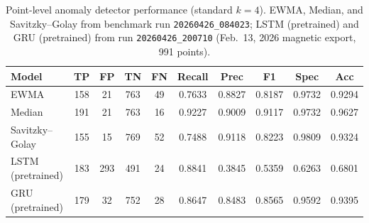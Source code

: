 
\begin{table}[htbp]
\centering
\caption{Point-level anomaly detector performance (standard $k{=}4$). EWMA, Median, and Savitzky--Golay from benchmark run \texttt{20260426\_084023}; LSTM (pretrained) and GRU (pretrained) from run \texttt{20260426\_200710} (Feb.\ 13, 2026 magnetic export, 991 points).}
\label{tab:performance_comparison_mixed_runs}

\begin{tabular}{|l|c|c|c|c|c|c|c|c|c|}
\hline
\textbf{Model} & \textbf{TP} & \textbf{FP} & \textbf{TN} & \textbf{FN} & \textbf{Recall} & \textbf{Prec} & \textbf{F1} & \textbf{Spec} & \textbf{Acc} \\
\hline
EWMA & 158 & 21 & 763 & 49 & 0.7633 & 0.8827 & 0.8187 & 0.9732 & 0.9294 \\
Median & 191 & 21 & 763 & 16 & 0.9227 & 0.9009 & 0.9117 & 0.9732 & 0.9627 \\
Savitzky--Golay & 155 & 15 & 769 & 52 & 0.7488 & 0.9118 & 0.8223 & 0.9809 & 0.9324 \\
LSTM (pretrained) & 183 & 293 & 491 & 24 & 0.8841 & 0.3845 & 0.5359 & 0.6263 & 0.6801 \\
GRU (pretrained) & 179 & 32 & 752 & 28 & 0.8647 & 0.8483 & 0.8565 & 0.9592 & 0.9395 \\
\hline
\end{tabular}
\end{table}
